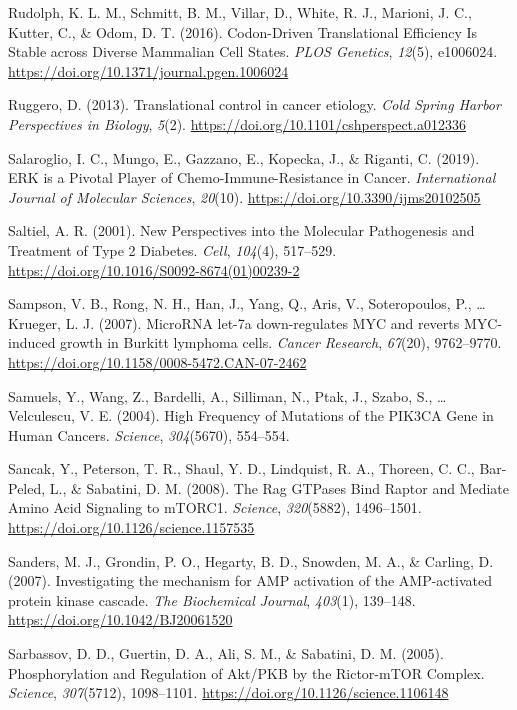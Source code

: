 \documentclass[12pt,openany]{book}
\begin{document}
\hypertarget{ref-Rudolph2016}{}
Rudolph, K. L. M., Schmitt, B. M., Villar, D., White, R. J., Marioni, J.
C., Kutter, C., \& Odom, D. T. (2016). Codon-Driven Translational
Efficiency Is Stable across Diverse Mammalian Cell States. \emph{PLOS
Genetics}, \emph{12}(5), e1006024.
\url{https://doi.org/10.1371/journal.pgen.1006024}

\hypertarget{ref-Ruggero2013}{}
Ruggero, D. (2013). Translational control in cancer etiology. \emph{Cold
Spring Harbor Perspectives in Biology}, \emph{5}(2).
\url{https://doi.org/10.1101/cshperspect.a012336}

\hypertarget{ref-Salaroglio2019}{}
Salaroglio, I. C., Mungo, E., Gazzano, E., Kopecka, J., \& Riganti, C.
(2019). ERK is a Pivotal Player of Chemo-Immune-Resistance in Cancer.
\emph{International Journal of Molecular Sciences}, \emph{20}(10).
\url{https://doi.org/10.3390/ijms20102505}

\hypertarget{ref-Saltiel2001}{}
Saltiel, A. R. (2001). New Perspectives into the Molecular Pathogenesis
and Treatment of Type 2 Diabetes. \emph{Cell}, \emph{104}(4), 517--529.
\url{https://doi.org/10.1016/S0092-8674(01)00239-2}

\hypertarget{ref-Sampson2007}{}
Sampson, V. B., Rong, N. H., Han, J., Yang, Q., Aris, V., Soteropoulos,
P., \ldots{} Krueger, L. J. (2007). MicroRNA let-7a down-regulates MYC
and reverts MYC-induced growth in Burkitt lymphoma cells. \emph{Cancer
Research}, \emph{67}(20), 9762--9770.
\url{https://doi.org/10.1158/0008-5472.CAN-07-2462}

\hypertarget{ref-Samuels2004}{}
Samuels, Y., Wang, Z., Bardelli, A., Silliman, N., Ptak, J., Szabo, S.,
\ldots{} Velculescu, V. E. (2004). High Frequency of Mutations of the
PIK3CA Gene in Human Cancers. \emph{Science}, \emph{304}(5670),
554--554.

\hypertarget{ref-Sancak2008}{}
Sancak, Y., Peterson, T. R., Shaul, Y. D., Lindquist, R. A., Thoreen, C.
C., Bar-Peled, L., \& Sabatini, D. M. (2008). The Rag GTPases Bind
Raptor and Mediate Amino Acid Signaling to mTORC1. \emph{Science},
\emph{320}(5882), 1496--1501.
\url{https://doi.org/10.1126/science.1157535}

\hypertarget{ref-Sanders2007}{}
Sanders, M. J., Grondin, P. O., Hegarty, B. D., Snowden, M. A., \&
Carling, D. (2007). Investigating the mechanism for AMP activation of
the AMP-activated protein kinase cascade. \emph{The Biochemical
Journal}, \emph{403}(1), 139--148.
\url{https://doi.org/10.1042/BJ20061520}

\hypertarget{ref-Sarbassov2005}{}
Sarbassov, D. D., Guertin, D. A., Ali, S. M., \& Sabatini, D. M. (2005).
Phosphorylation and Regulation of Akt/PKB by the Rictor-mTOR Complex.
\emph{Science}, \emph{307}(5712), 1098--1101.
\url{https://doi.org/10.1126/science.1106148}
\end{document}
